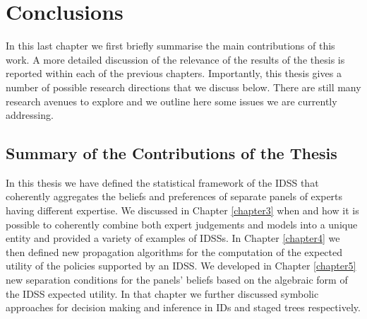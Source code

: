 
\chapter{Conclusions} %

\label{chapter6} %


In this last chapter we first briefly summarise the main contributions of  this work. A more detailed discussion of the relevance of the results of the thesis is reported within each of the previous chapters. Importantly, this thesis gives a number of possible research directions that we discuss below. There are still many research avenues to explore and we outline here some issues we are currently addressing.

\section*{Summary of the Contributions of the Thesis}

In this thesis we have defined the statistical framework of the IDSS that coherently aggregates the beliefs and preferences of separate panels of experts having different expertise. We  discussed in Chapter \ref{chapter3} when and how it is possible to coherently combine both expert judgements and models into a unique entity and provided a variety of examples of IDSSs. In Chapter \ref{chapter4} we then defined new propagation algorithms for the computation of the expected utility of the policies supported by an IDSS. We developed in Chapter \ref{chapter5} new separation conditions for the panels' beliefs based on the algebraic form of the IDSS expected utility. In that chapter we further discussed symbolic approaches for decision making and inference in IDs and staged trees respectively.  


